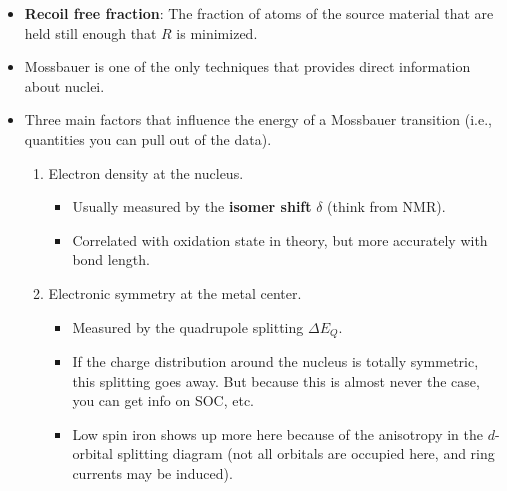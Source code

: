 \documentclass[../notes.tex]{subfiles}
\begin{document}
\begin{itemize}
\begin{itemize}
\begin{itemize}
            \item A Doppler shift is relevant to the experimental setup of Mossbauer.
            \item Essentially, you literally hook up your emitter to a speaker and vibrate it at a hertz frequency to add or subtract a tiny bit of energy to/from the gamma rays.
            \item This setup allows you to get resolution in a very small window around a certain excitation energy of your nucleus.
            \item It also leads to the common unit of \si[per-mode=symbol]{\milli\meter\per\second}.
        \end{itemize}
    \end{itemize}
    \item \textbf{Recoil free fraction}: The fraction of atoms of the source material that are held still enough that $R$ is minimized.
    \item Mossbauer is one of the only techniques that provides direct information about nuclei.
    \item Three main factors that influence the energy of a Mossbauer transition (i.e., quantities you can pull out of the data).
    \begin{enumerate}
        \item Electron density at the nucleus.
        \begin{itemize}
            \item Usually measured by the \textbf{isomer shift} $\delta$ (think \si{\ppm} from NMR).
            \item Correlated with oxidation state in theory, but more accurately with bond length.
        \end{itemize}
        \item Electronic symmetry at the metal center.
        \begin{itemize}
            \item Measured by the quadrupole splitting $\Delta E_Q$.
            \item If the charge distribution around the nucleus is totally symmetric, this splitting goes away. But because this is almost never the case, you can get info on SOC, etc.
            \item Low spin iron shows up more here because of the anisotropy in the $d$-orbital splitting diagram (not all orbitals are occupied here, and ring currents may be induced).
            \begin{itemize}

\end{itemize}
\end{itemize}
\end{enumerate}
\end{itemize}
\end{document}
